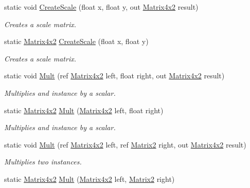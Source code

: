 \begin{DoxyCompactItemize}
static void \hyperlink{struct_open_t_k_1_1_matrix4x2_a1e13d9f6e57c0e4ca2d5afa2a6b76c79}{Create\-Scale} (float x, float y, out \hyperlink{struct_open_t_k_1_1_matrix4x2}{Matrix4x2} result)
\begin{DoxyCompactList}\small\item\em Creates a scale matrix. \end{DoxyCompactList}\item 
static \hyperlink{struct_open_t_k_1_1_matrix4x2}{Matrix4x2} \hyperlink{struct_open_t_k_1_1_matrix4x2_ae6840e153fef1cea08deeb10a2e2ef01}{Create\-Scale} (float x, float y)
\begin{DoxyCompactList}\small\item\em Creates a scale matrix. \end{DoxyCompactList}\item 
static void \hyperlink{struct_open_t_k_1_1_matrix4x2_aba774236e1be7064c08b07f85528cfda}{Mult} (ref \hyperlink{struct_open_t_k_1_1_matrix4x2}{Matrix4x2} left, float right, out \hyperlink{struct_open_t_k_1_1_matrix4x2}{Matrix4x2} result)
\begin{DoxyCompactList}\small\item\em Multiplies and instance by a scalar. \end{DoxyCompactList}\item 
static \hyperlink{struct_open_t_k_1_1_matrix4x2}{Matrix4x2} \hyperlink{struct_open_t_k_1_1_matrix4x2_a11bcbd6bea906a0d7b972cd9e2759e94}{Mult} (\hyperlink{struct_open_t_k_1_1_matrix4x2}{Matrix4x2} left, float right)
\begin{DoxyCompactList}\small\item\em Multiplies and instance by a scalar. \end{DoxyCompactList}\item 
static void \hyperlink{struct_open_t_k_1_1_matrix4x2_a902adb63f521ab453bb77185f3e72835}{Mult} (ref \hyperlink{struct_open_t_k_1_1_matrix4x2}{Matrix4x2} left, ref \hyperlink{struct_open_t_k_1_1_matrix2}{Matrix2} right, out \hyperlink{struct_open_t_k_1_1_matrix4x2}{Matrix4x2} result)
\begin{DoxyCompactList}\small\item\em Multiplies two instances. \end{DoxyCompactList}\item 
static \hyperlink{struct_open_t_k_1_1_matrix4x2}{Matrix4x2} \hyperlink{struct_open_t_k_1_1_matrix4x2_a28837df33e2cde512ffb30374fc27af4}{Mult} (\hyperlink{struct_open_t_k_1_1_matrix4x2}{Matrix4x2} left, \hyperlink{struct_open_t_k_1_1_matrix2}{Matrix2} right)

\end{DoxyCompactItemize}
